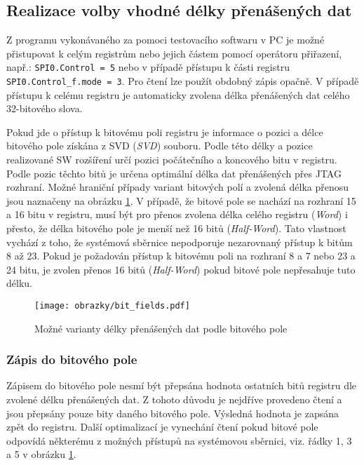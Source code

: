 \subsection{Realizace volby vhodné délky přenášených dat}
Z programu vykonávaného za pomoci testovacího softwaru v PC je možné přistupovat k celým registrům nebo jejich částem pomocí operátoru přiřazení, např.: \texttt{SPI0.Control = 5} nebo v případě přístupu k části registru \texttt{SPI0.Control\_f.mode = 3}. Pro čtení lze použít obdobný zápis opačně. V případě přístupu k celému registru je automaticky zvolena délka přenášených dat celého 32-bitového slova.

Pokud jde o přístup k bitovému poli registru je informace o pozici a délce bitového pole získána z \acs{SVD} (\textit{\acl{SVD}}) souboru. Podle této délky a pozice realizované SW rozšíření určí pozici počátečního a koncového bitu v registru. Podle pozic těchto bitů je určena optimální délka dat přenášených přes \acs{JTAG} rozhraní. Možné hraniční případy variant bitových polí a zvolená délka přenosu jsou naznačeny na obrázku \ref{fig:bit_fields}. V případě, že bitové pole se nachází na rozhraní 15 a 16 bitu v registru, musí být pro přenos zvolena délka celého registru (\textit{Word}) i přesto, že délka bitového pole je menší než 16 bitů (\textit{Half-Word}). Tato vlastnost vychází z toho, že systémová sběrnice nepodporuje nezarovnaný přístup k bitům 8 až 23. Pokud je požadován přístup k bitovému poli na rozhraní 8 a 7 nebo 23 a 24 bitu, je zvolen přenos 16 bitů (\textit{Half-Word}) pokud bitové pole nepřesahuje tuto délku. \cite{ri5cy}

\begin{figure}[H]
  \begin{center}
    \texttt{[image: obrazky/bit\_fields.pdf]}
  \end{center}
  \caption{Možné varianty délky přenášených dat podle bitového pole}
	\label{fig:bit_fields}
\end{figure}

\subsubsection{Zápis do bitového pole}
Zápisem do bitového pole nesmí být přepsána hodnota ostatních bitů registru dle zvolené délku přenášených dat. Z tohoto důvodu je nejdříve provedeno čtení a jsou přepsány pouze bity daného bitového pole. Výsledná hodnota je zapsána zpět do registru. Další optimalizací je vynechání čtení pokud bitové pole odpovídá některému z možných přístupů na systémovou sběrnici, viz. řádky 1, 3 a 5 v obrázku \ref{fig:bit_fields}. 


